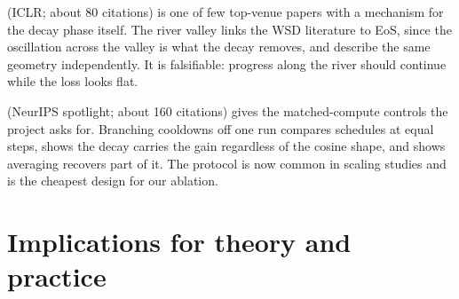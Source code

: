 \documentclass[10pt]{article}
\begin{document}
\textbf{\citet{wen2025river}} (ICLR; about 80 citations) is one of few top-venue papers with a
mechanism for the decay phase itself. The river valley links the WSD literature to EoS, since the
oscillation across the valley is what the decay removes, and \citet{andriushchenko2023sparse}
describe the same geometry independently. It is falsifiable: progress along the river should
continue while the loss looks flat.

\textbf{\citet{hagele2024scaling}} (NeurIPS spotlight; about 160 citations) gives the matched-compute
controls the project asks for. Branching cooldowns off one run compares schedules at equal steps,
shows the decay carries the gain regardless of the cosine shape, and shows averaging recovers part of
it. The protocol is now common in scaling studies and is the cheapest design for our ablation.

\clearpage
\section{Implications for theory and practice}
\label{sec:implications}
\end{document}
